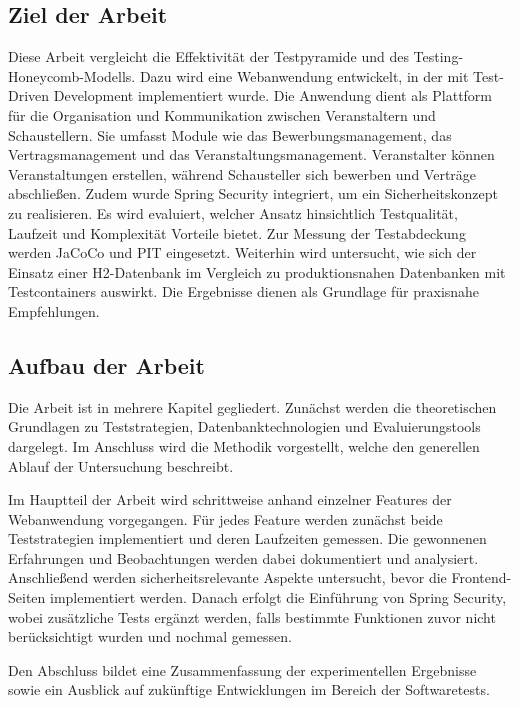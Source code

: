 \subsection{Ziel der Arbeit}
Diese Arbeit vergleicht die Effektivität der Testpyramide und des Testing-Honeycomb-Modells. Dazu wird eine Webanwendung entwickelt, in der mit Test-Driven Development implementiert wurde. Die Anwendung dient als Plattform für die Organisation und Kommunikation zwischen Veranstaltern und Schaustellern. Sie umfasst Module wie das Bewerbungsmanagement, das Vertragsmanagement und das Veranstaltungsmanagement. Veranstalter können Veranstaltungen erstellen, während Schausteller sich bewerben und Verträge abschließen.  Zudem wurde Spring Security integriert, um ein Sicherheitskonzept zu realisieren. Es wird evaluiert, welcher Ansatz hinsichtlich Testqualität, Laufzeit und Komplexit\"at Vorteile bietet. Zur Messung der Testabdeckung werden JaCoCo und PIT eingesetzt. Weiterhin wird untersucht, wie sich der Einsatz einer H2-Datenbank im Vergleich zu produktionsnahen Datenbanken mit Testcontainers auswirkt. Die Ergebnisse dienen als Grundlage f\"ur praxisnahe Empfehlungen.

\subsection{Aufbau der Arbeit}
Die Arbeit ist in mehrere Kapitel gegliedert. Zunächst werden die theoretischen Grundlagen zu Teststrategien, Datenbanktechnologien und Evaluierungstools dargelegt. Im Anschluss wird die Methodik vorgestellt, welche den generellen Ablauf der Untersuchung beschreibt. 

Im Hauptteil der Arbeit wird schrittweise anhand einzelner Features der Webanwendung vorgegangen. Für jedes Feature werden zunächst beide Teststrategien implementiert und deren Laufzeiten gemessen. Die gewonnenen Erfahrungen und Beobachtungen werden dabei dokumentiert und analysiert. Anschließend werden sicherheitsrelevante Aspekte untersucht, bevor die Frontend-Seiten implementiert werden. Danach erfolgt die Einführung von Spring Security, wobei zusätzliche Tests ergänzt werden, falls bestimmte Funktionen zuvor nicht berücksichtigt wurden und nochmal gemessen.

Den Abschluss bildet eine Zusammenfassung der experimentellen Ergebnisse sowie ein Ausblick auf zukünftige Entwicklungen im Bereich der Softwaretests.
